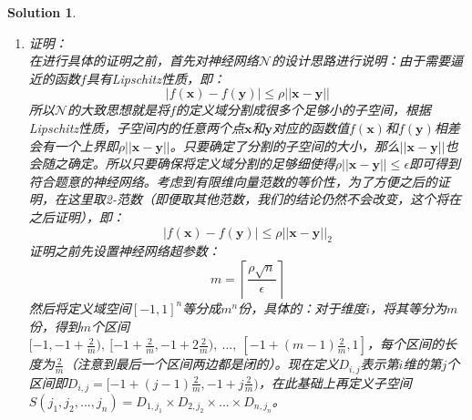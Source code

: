 \documentclass[a4paper,UTF8]{article}
\numberwithin{equation}{section}
\newtheorem*{solution}{Solution}
\begin{document}
\begin{solution}
\begin{enumerate}[ {(}1{)}]
\begin{algorithm}[h]  
	\caption{GetWeightFromIndex}  
	\begin{algorithmic}[1]  
		\Require  
		$s$ : T层的神经元编号  
		\Ensure  
		$w_s$ : 从T层到输出层的边中$\delta_s$对应的边的权重
		\State $(index_1, index_2,...,index_n) = IndexTranslate(s)$ 
		\State $xt_i = -1 + (index_i - \frac{1}{2})\frac{2}{m}$
		\EndFor
		\State $\mathbf{xt} = [xt_1, xt_2,...,xt_n] $
		\State $w_s = f(\mathbf{xt})$
		\label{code:recentEnd}  
	\end{algorithmic}  
\end{algorithm}\\
通过上述算法计算每一个$\delta_i$的权值$w_i = GetWeightFromIndex(i)$。\\
输出层的最终输出：
\begin{equation}
z = \sum_{i=1}^{m^n}w_i\delta_i
\end{equation}
\item 证明：\\
在进行具体的证明之前，首先对神经网络$\mathcal{N}$的设计思路进行说明：由于需要逼近的函数$f$具有Lipschitz性质，即：
\begin{equation}
|f(\mathbf{x}) - f(\mathbf{y})| \leq \rho||\mathbf{x} - \mathbf{y}||
\end{equation}
所以$\mathcal{N}$的大致思想就是将$f$的定义域分割成很多个足够小的子空间，根据Lipschitz性质，子空间内的任意两个点$\mathbf{x}$和$\mathbf{y}$对应的函数值$f(\mathbf{x})$和$f(\mathbf{y})$相差会有一个上界即$\rho||\mathbf{x} - \mathbf{y}||$。只要确定了分割的子空间的大小，那么$||\mathbf{x} - \mathbf{y}||$也会随之确定。所以只要确保将定义域分割的足够细使得$\rho||\mathbf{x} - \mathbf{y}|| \leq \epsilon$即可得到符合题意的神经网络。考虑到有限维向量范数的等价性，为了方便之后的证明，在这里取2-范数（即便取其他范数，我们的结论仍然不会改变，这个将在之后证明），即：
\begin{equation}
|f(\mathbf{x}) - f(\mathbf{y})| \leq \rho||\mathbf{x} - \mathbf{y}||_2
\end{equation}
证明之前先设置神经网络超参数：
\begin{equation}
m=\left\lceil\frac{\rho\sqrt{n}}{\epsilon}\right\rceil	
\end{equation}
然后将定义域空间$[-1,1]^n$等分成$m^n$份，具体的：对于维度$i$，将其等分为$m$份，得到$m$个区间$[-1, -1+\frac{2}{m}),\ [-1+\frac{2}{m},-1+2\frac{2}{m}),\ ...,\ [-1 + (m-1)\frac{2}{m}, 1]$，每个区间的长度为$\frac{2}{m}$（注意到最后一个区间两边都是闭的）。现在定义$D_{i,j}$表示第$i$维的第$j$个区间即$D_{i,j} = [-1+(j-1)\frac{2}{m},-1+j\frac{2}{m})$，在此基础上再定义子空间$S(j_1,j_2,...,j_n) = D_{1,j_1} \times D_{2,j_2} \times ... \times D_{n, j_n}$。\\

\end{enumerate}
\end{solution}
\end{document}
